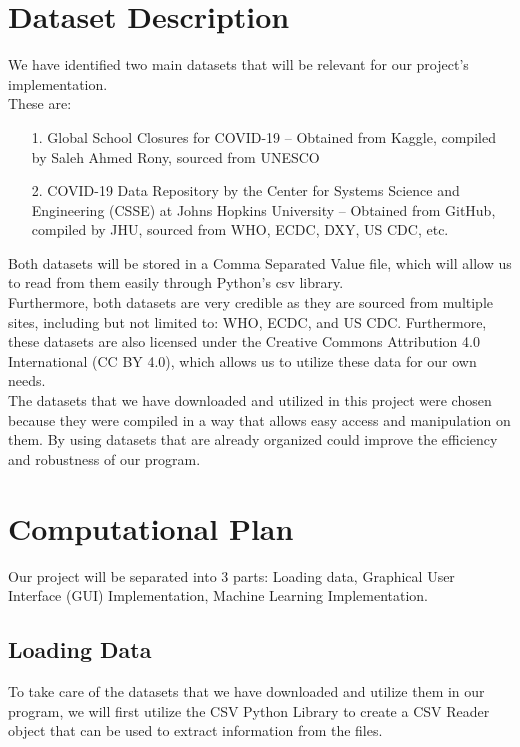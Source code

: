 \documentclass[fontsize=11pt]{article}
\begin{document}
\section*{Dataset Description}

We have identified two main datasets that will be relevant for our project’s implementation.\\

These are: 

\begin{enumerate}
    \item [1. ]
        Global School Closures for COVID-19 – Obtained from Kaggle, compiled by Saleh Ahmed Rony, sourced from UNESCO
        
    \item [2. ]
        COVID-19 Data Repository by the Center for Systems Science and Engineering (CSSE) at Johns Hopkins University – Obtained from GitHub, compiled by JHU, sourced from WHO, ECDC, DXY, US CDC, etc. 
\end{enumerate}

Both datasets will be stored in a Comma Separated Value file, which will allow us to read from them easily through Python’s csv library. \\


Furthermore, both datasets are very credible as they are sourced from multiple sites, including but not limited to: WHO, ECDC, and US CDC. Furthermore, these datasets are also licensed under the Creative Commons Attribution 4.0 International (CC BY 4.0), which allows us to utilize these data for our own needs. \\


The datasets that we have downloaded and utilized in this project were chosen because they were compiled in a way that allows easy access and manipulation on them. By using datasets that are already organized could improve the efficiency and robustness of our program. 

\newpage


\section*{Computational Plan}

Our project will be separated into 3 parts: Loading data, Graphical User Interface (GUI) Implementation, Machine Learning Implementation.  
\subsection*{Loading Data}
    To take care of the datasets that we have downloaded and utilize them in our program, we will first utilize the CSV Python Library to create a CSV Reader object that can be used to extract information from the files. \\
    
\end{document}
